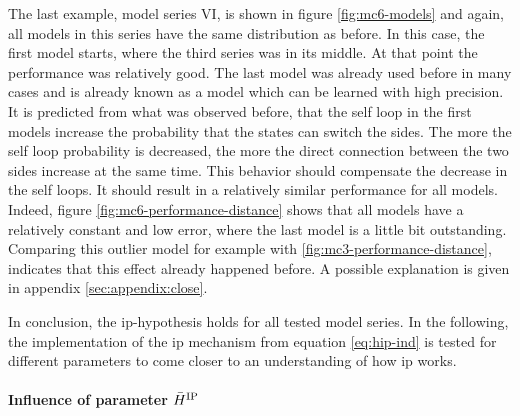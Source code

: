 The last example, model series VI, is shown in figure \ref{fig:mc6-models} and again, all models in this series have the same distribution as before. In this case, the first model starts, where the third series was in its middle. At that point the performance was relatively good. The last model was already used before in many cases and is already known as a model which can be learned with high precision. It is predicted from what was observed before, that the self loop in the first models increase the probability that the states can switch the sides. The more the self loop probability is decreased, the more the direct connection between the two sides increase at the same time. This behavior should compensate the decrease in the self loops. It should result in a relatively similar performance for all models. Indeed, figure \ref{fig:mc6-performance-distance} shows that all models have a relatively constant and low error, where the last model is a little bit outstanding. Comparing this outlier model for example with \ref{fig:mc3-performance-distance}, indicates that this effect already happened before. A possible explanation is given in appendix \ref{sec:appendix:close}.

In conclusion, the \acs{ip}-hypothesis holds for all tested model series. In the following, the implementation of the \acl{ip} mechanism from equation \eqref{eq:hip-ind} is tested for different parameters to come closer to an understanding of how \acs{ip} works.

\paragraph{Influence of parameter $\bar H^{\text{IP}}$}

